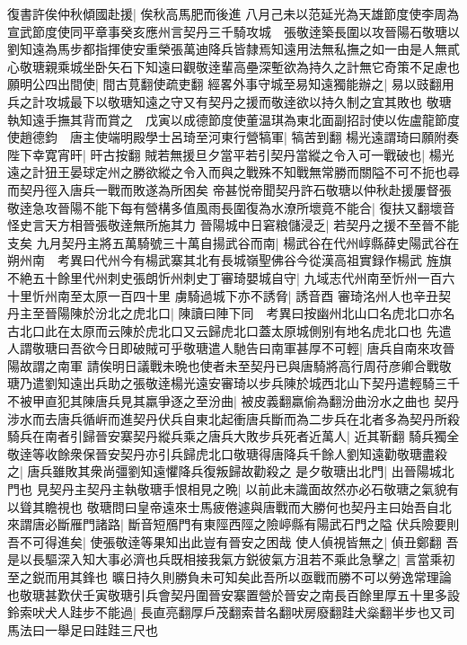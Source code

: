 復書許俟仲秋傾國赴援|{
	俟秋高馬肥而後進}
八月己未以范延光為天雄節度使李周為宣武節度使同平章事癸亥應州言契丹三千騎攻城　張敬逹築長圍以攻晉陽石敬瑭以劉知遠為馬步都指揮使安重榮張萬迪降兵皆隸焉知遠用法無私撫之如一由是人無貳心敬瑭親乘城坐卧矢石下知遠曰觀敬逹輩高壘深塹欲為持久之計無它奇策不足慮也願明公四出間使|{
	間古莧翻使疏吏翻}
經畧外事守城至易知遠獨能辦之|{
	易以豉翻用兵之計攻城最下以敬瑭知遠之守又有契丹之援而敬逹欲以持久制之宜其敗也}
敬瑭執知遠手撫其背而賞之　戊寅以成德節度使董温琪為東北面副招討使以佐盧龍節度使趙德鈞　唐主使端明殿學士呂琦至河東行營犒軍|{
	犒苦到翻}
楊光遠謂琦曰願附奏陛下幸寛宵旰|{
	旰古按翻}
賊若無援旦夕當平若引契丹當縱之令入可一戰破也|{
	楊光遠之計狃王晏球定州之勝欲縱之令入而與之戰殊不知戰無常勝而關隘不可不扼也尋而契丹徑入唐兵一戰而敗遂為所困矣}
帝甚悦帝聞契丹許石敬瑭以仲秋赴援屢督張敬逹急攻晉陽不能下每有營構多值風雨長圍復為水潦所壞竟不能合|{
	復扶又翻壞音怪史言天方相晉張敬逹無所施其力}
晉陽城中日窘粮儲浸乏|{
	若契丹之援不至晉不能支矣}
九月契丹主將五萬騎號三十萬自揚武谷而南|{
	楊武谷在代州崞縣薛史陽武谷在朔州南　考異曰代州今有楊武寨其北有長城嶺聖佛谷今從漢高祖實録作楊武}
旌旗不絶五十餘里代州刺史張朗忻州刺史丁審琦嬰城自守|{
	九域志代州南至忻州一百六十里忻州南至太原一百四十里}
虜騎過城下亦不誘脅|{
	誘音酉}
審琦洺州人也辛丑契丹主至晉陽陳於汾北之虎北口|{
	陳讀曰陣下同　考異曰按幽州北山口名虎北口亦名古北口此在太原而云陳於虎北口又云歸虎北口蓋太原城側别有地名虎北口也}
先遣人謂敬瑭曰吾欲今日即破賊可乎敬瑭遣人馳告曰南軍甚厚不可輕|{
	唐兵自南來攻晉陽故謂之南軍}
請俟明日議戰未晩也使者未至契丹已與唐騎將高行周苻彦卿合戰敬瑭乃遣劉知遠出兵助之張敬逹楊光遠安審琦以步兵陳於城西北山下契丹遣輕騎三千不被甲直犯其陳唐兵見其羸爭逐之至汾曲|{
	被皮義翻羸偷為翻汾曲汾水之曲也}
契丹涉水而去唐兵循㟁而進契丹伏兵自東北起衝唐兵斷而為二步兵在北者多為契丹所殺騎兵在南者引歸晉安寨契丹縱兵乘之唐兵大敗步兵死者近萬人|{
	近其靳翻}
騎兵獨全敬逹等收餘衆保晉安契丹亦引兵歸虎北口敬瑭得唐降兵千餘人劉知遠勸敬瑭盡殺之|{
	唐兵雖敗其衆尚彊劉知遠懼降兵復叛歸故勸殺之}
是夕敬瑭出北門|{
	出晉陽城北門也}
見契丹主契丹主執敬瑭手恨相見之晩|{
	以前此未識面故然亦必石敬瑭之氣貌有以聳其瞻視也}
敬瑭問曰皇帝遠來士馬疲倦遽與唐戰而大勝何也契丹主曰始吾自北來謂唐必斷雁門諸路|{
	斷音短鴈門有東陘西陘之險嵉縣有陽武石門之隘}
伏兵險要則吾不可得進矣|{
	使張敬逹等果知出此豈有晉安之困哉}
使人偵視皆無之|{
	偵丑鄭翻}
吾是以長驅深入知大事必濟也兵既相接我氣方鋭彼氣方沮若不乘此急擊之|{
	言當乘初至之鋭而用其鋒也}
曠日持久則勝負未可知矣此吾所以亟戰而勝不可以勞逸常理論也敬瑭甚歎伏壬寅敬瑭引兵會契丹圍晉安寨置營於晉安之南長百餘里厚五十里多設鈴索吠犬人跬步不能過|{
	長直亮翻厚戶茂翻索昔名翻吠房廢翻跬犬橤翻半步也又司馬法曰一舉足曰跬跬三尺也}
